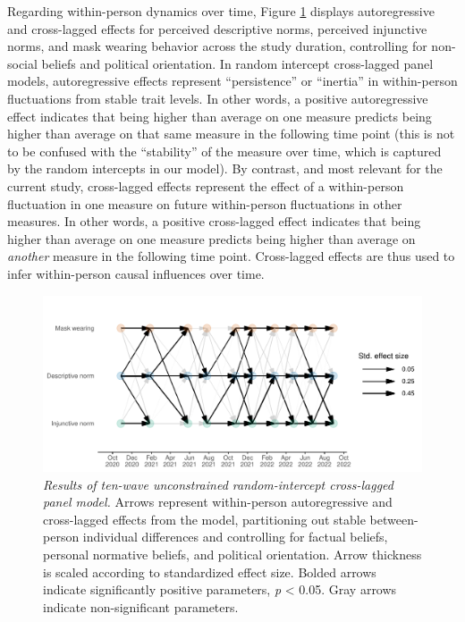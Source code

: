 \documentclass[
  man,floatsintext]{apa6}
\begin{document}
Regarding within-person dynamics over time, Figure \ref{fig:plotRICLPM} displays autoregressive and cross-lagged effects for perceived descriptive norms, perceived injunctive norms, and mask wearing behavior across the study duration, controlling for non-social beliefs and political orientation. In random intercept cross-lagged panel models, autoregressive effects represent ``persistence'' or ``inertia'' in within-person fluctuations from stable trait levels. In other words, a positive autoregressive effect indicates that being higher than average on one measure predicts being higher than average on that same measure in the following time point (this is not to be confused with the ``stability'' of the measure over time, which is captured by the random intercepts in our model). By contrast, and most relevant for the current study, cross-lagged effects represent the effect of a within-person fluctuation in one measure on future within-person fluctuations in other measures. In other words, a positive cross-lagged effect indicates that being higher than average on one measure predicts being higher than average on \emph{another} measure in the following time point. Cross-lagged effects are thus used to infer within-person causal influences over time.



\begin{figure}
\centering
\includegraphics{manuscript_files/figure-latex/plotRICLPM-1.pdf}
\caption{\label{fig:plotRICLPM}\emph{Results of ten-wave unconstrained random-intercept cross-lagged panel model.} Arrows represent within-person autoregressive and cross-lagged effects from the model, partitioning out stable between-person individual differences and controlling for factual beliefs, personal normative beliefs, and political orientation. Arrow thickness is scaled according to standardized effect size. Bolded arrows indicate significantly positive parameters, \emph{p} \textless{} 0.05. Gray arrows indicate non-significant parameters.}
\end{figure}
\end{document}
